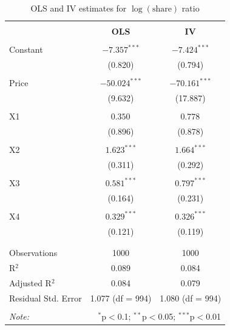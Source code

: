 \begin{table}[H] \centering 
  \label{tab:ols_iv_logshare} 
\begin{tabular}{@{\extracolsep{5pt}}lcc} 
\\[-1.8ex]\hline 
\hline \\[-1.8ex] 
 & \textbf{OLS} & \textbf{IV} \\ 
\hline \\[-1.8ex] 
Constant & $-7.357^{***}$ & $-7.424^{***}$ \\ 
 & (0.820) & (0.794) \\ 
 & & \\ 
Price & $-50.024^{***}$ & $-70.161^{***}$ \\ 
 & (9.632) & (17.887) \\ 
 & & \\ 
X1 & $0.350^{}$ & $0.778^{}$ \\ 
 & (0.896) & (0.878) \\ 
 & & \\ 
X2 & $1.623^{***}$ & $1.664^{***}$ \\ 
 & (0.311) & (0.292) \\ 
 & & \\ 
X3 & $0.581^{***}$ & $0.797^{***}$ \\ 
 & (0.164) & (0.231) \\ 
 & & \\ 
X4 & $0.329^{***}$ & $0.326^{***}$ \\ 
 & (0.121) & (0.119) \\ 
 & & \\ 
\hline \\[-1.8ex] 
Observations & 1000 & 1000 \\ 
R$^{2}$ & 0.089 & 0.084 \\ 
Adjusted R$^{2}$ & 0.084 & 0.079 \\ 
Residual Std. Error & 1.077 (df = 994) & 1.080 (df = 994) \\ 
\hline 
\hline \\[-1.8ex] 
\textit{Note:} & \multicolumn{2}{r}{$^{*}$p$<$0.1; $^{**}$p$<$0.05; $^{***}$p$<$0.01} \\ 
\end{tabular} 
  \caption{OLS and IV estimates for $\log(\text{share})$ ratio} 
\end{table}
